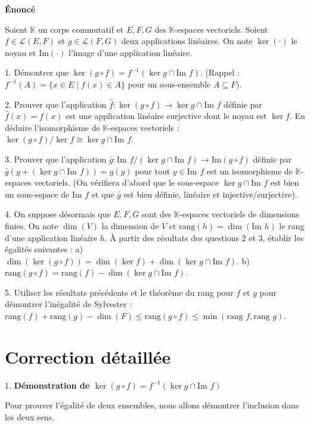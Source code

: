 \documentclass{report}
\begin{document}
\textbf{Énoncé}

Soient $\mathbb{K}$ un corps commutatif et $E, F, G$ des $\mathbb{K}$-espaces vectoriels.
Soient $f \in \mathcal{L}(E, F)$ et $g \in \mathcal{L}(F, G)$ deux applications linéaires.
On note $\ker(\cdot)$ le noyau et $\text{Im}(\cdot)$ l'image d'une application linéaire.

1.  Démontrer que $\ker(g \circ f) = f^{-1}(\ker g \cap \text{Im } f)$.
    (Rappel : $f^{-1}(A) = \{x \in E \mid f(x) \in A\}$ pour un sous-ensemble $A \subseteq F$).

2.  Prouver que l'application $\hat{f}: \ker(g \circ f) \to \ker g \cap \text{Im } f$ définie par $\hat{f}(x) = f(x)$ est une application linéaire surjective dont le noyau est $\ker f$. En déduire l'isomorphisme de $\mathbb{K}$-espaces vectoriels : $\ker(g \circ f) / \ker f \cong \ker g \cap \text{Im } f$.

3.  Prouver que l'application $\bar{g}: \text{Im } f / (\ker g \cap \text{Im } f) \to \text{Im}(g \circ f)$ définie par $\bar{g}(y + (\ker g \cap \text{Im } f)) = g(y)$ pour tout $y \in \text{Im } f$ est un isomorphisme de $\mathbb{K}$-espaces vectoriels.
    (On vérifiera d'abord que le sous-espace $\ker g \cap \text{Im } f$ est bien un sous-espace de $\text{Im } f$ et que $\bar{g}$ est bien définie, linéaire et injective/surjective).

4.  On suppose désormais que $E, F, G$ sont des $\mathbb{K}$-espaces vectoriels de dimensions finies. On note $\dim(V)$ la dimension de $V$ et $\text{rang}(h) = \dim(\text{Im } h)$ le rang d'une application linéaire $h$.
    À partir des résultats des questions 2 et 3, établir les égalités suivantes :
    a) $\dim(\ker(g \circ f)) = \dim(\ker f) + \dim(\ker g \cap \text{Im } f)$.
    b) $\text{rang}(g \circ f) = \text{rang}(f) - \dim(\ker g \cap \text{Im } f)$.

5.  Utiliser les résultats précédents et le théorème du rang pour $f$ et $g$ pour démontrer l'inégalité de Sylvester :
    $\text{rang}(f) + \text{rang}(g) - \dim(F) \le \text{rang}(g \circ f) \le \min(\text{rang } f, \text{rang } g)$.

\section*{Correction détaillée}

1.  \textbf{Démonstration de $\ker(g \circ f) = f^{-1}(\ker g \cap \text{Im } f)$}

    Pour prouver l'égalité de deux ensembles, nous allons démontrer l'inclusion dans les deux sens.
\end{document}
